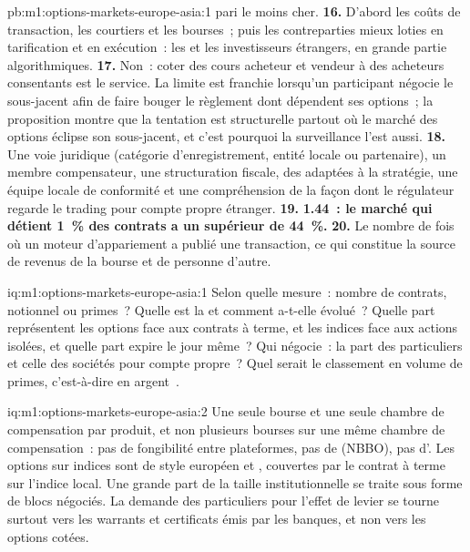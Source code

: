 \begin{solution}{pb:m1:options-markets-europe-asia:1}
pari le moins cher.
\textbf{16.} D'abord les coûts de transaction, les courtiers et les bourses~; puis les
contreparties mieux loties en tarification et en exécution~: les  et les investisseurs étrangers, en grande partie algorithmiques.
\textbf{17.} Non~: coter des cours acheteur et vendeur à des acheteurs consentants est le service.
La limite est franchie lorsqu'un participant négocie le sous-jacent afin de
faire bouger le règlement dont dépendent ses options~; la proposition montre que
la tentation est structurelle partout où le marché des options éclipse son
sous-jacent, et c'est pourquoi la surveillance l'est aussi.
\textbf{18.} Une voie juridique (catégorie d'enregistrement, entité locale ou
partenaire), un membre compensateur, une structuration fiscale, des 
adaptées à la stratégie, une équipe locale de conformité et une compréhension de
la façon dont le régulateur regarde le trading pour compte propre étranger.
\textbf{19.} \textbf{1.44~: le marché qui détient 1~\% des contrats a un 
supérieur de 44~\%.}
\textbf{20.} Le nombre de fois où un moteur d'appariement a publié une transaction, ce qui
constitue la source de revenus de la bourse et de personne d'autre.
\end{solution}

\begin{solution}{iq:m1:options-markets-europe-asia:1}
Selon quelle mesure~: nombre de contrats, notionnel ou primes~? Quelle est la  et
comment a-t-elle évolué~? Quelle part représentent les options face aux contrats à terme, et les indices face aux
actions isolées, et quelle part expire le jour même~? Qui négocie~: la part des particuliers
et celle des sociétés pour compte propre~? Quel serait le classement
en volume de primes, c'est-à-dire en argent~.
\end{solution}

\begin{solution}{iq:m1:options-markets-europe-asia:2}
Une seule bourse et une seule chambre de compensation par produit, et non plusieurs bourses sur une
même chambre de compensation~: pas de fongibilité entre plateformes, pas de  (NBBO),
pas d'. Les options sur indices sont de style européen et , couvertes par le contrat à terme sur l'indice local. Une grande part de la taille institutionnelle
se traite sous forme de blocs négociés. La demande des particuliers pour l'effet de levier se tourne surtout vers
les warrants et certificats émis par les banques, et non vers les options cotées.
\end{solution}


